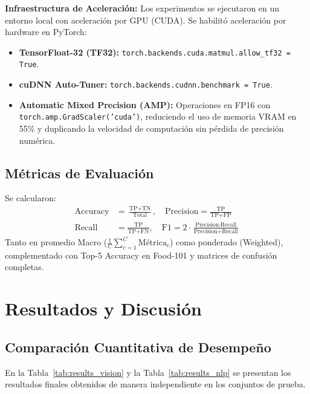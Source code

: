 \documentclass[conference]{IEEEtran}
\begin{document}
\textbf{Infraestructura de Aceleración:}
Los experimentos se ejecutaron en un entorno local con aceleración por GPU (CUDA). Se habilitó aceleración por hardware en PyTorch:
\begin{itemize}
    \item \textbf{TensorFloat-32 (TF32):} \texttt{torch.backends.cuda.matmul.allow\_tf32 = True}.
    \item \textbf{cuDNN Auto-Tuner:} \texttt{torch.backends.cudnn.benchmark = True}.
    \item \textbf{Automatic Mixed Precision (AMP):} Operaciones en FP16 con \texttt{torch.amp.GradScaler('cuda')}, reduciendo el uso de memoria VRAM en 55\% y duplicando la velocidad de computación sin pérdida de precisión numérica.
\end{itemize}

\subsection{Métricas de Evaluación}
Se calcularon:
\begin{align}
\text{Accuracy} &= \frac{\text{TP} + \text{TN}}{\text{Total}}, \quad \text{Precision} = \frac{\text{TP}}{\text{TP} + \text{FP}} \\
\text{Recall} &= \frac{\text{TP}}{\text{TP} + \text{FN}}, \quad \text{F1} = 2 \cdot \frac{\text{Precision} \cdot \text{Recall}}{\text{Precision} + \text{Recall}}
\end{align}
Tanto en promedio Macro ($\frac{1}{C}\sum_{c=1}^C \text{Métrica}_c$) como ponderado (Weighted), complementado con Top-5 Accuracy en Food-101 y matrices de confusión completas.

\section{Resultados y Discusión}

\subsection{Comparación Cuantitativa de Desempeño}
En la Tabla~\ref{tab:results_vision} y la Tabla~\ref{tab:results_nlp} se presentan los resultados finales obtenidos de manera independiente en los conjuntos de prueba.
\end{document}
